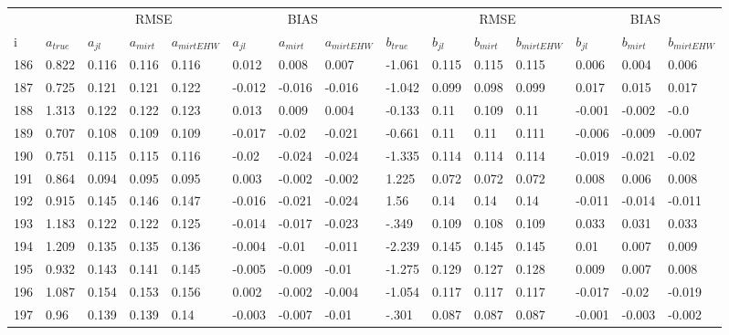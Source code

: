 \begin{table}
	\renewcommand{\arraystretch}{1}%
	\footnotesize
	\centering \begin{tabular}{|l|l|lll|lll|l|lll|lll}
		& &  \multicolumn{3}{c}{RMSE}& \multicolumn{3}{c}{BIAS}& & \multicolumn{3}{c}{RMSE}& \multicolumn{3}{c}{BIAS} \\
		i & $a_{true}$ & $a_{jl}$ & $a_{mirt}$ & $a_{mirt EHW}$ & $ a_{jl} $ & $ a_{mirt} $ & $ a_{mirt EHW} $ & $ b_{true} $ & $ b_{jl} $ & $ b_{mirt} $ & $ b_{mirt EHW} $ & $ b_{jl} $ & $b_{mirt}$ & $b_{mirt EHW}$\\
		\hline
		186 & 0.822 & 0.116 & 0.116 & 0.116 & 0.012 & 0.008 & 0.007 & -1.061 & 0.115 & 0.115 & 0.115 & 0.006 & 0.004 & 0.006 \\
		187 & 0.725 & 0.121 & 0.121 & 0.122 & -0.012 & -0.016 & -0.016 & -1.042 & 0.099 & 0.098 & 0.099 & 0.017 & 0.015 & 0.017 \\
		188 & 1.313 & 0.122 & 0.122 & 0.123 & 0.013 & 0.009 & 0.004 & -0.133 & 0.11 & 0.109 & 0.11 & -0.001 & -0.002 & -0.0 \\
		189 & 0.707 & 0.108 & 0.109 & 0.109 & -0.017 & -0.02 & -0.021 & -0.661 & 0.11 & 0.11 & 0.111 & -0.006 & -0.009 & -0.007 \\
		190 & 0.751 & 0.115 & 0.115 & 0.116 & -0.02 & -0.024 & -0.024 & -1.335 & 0.114 & 0.114 & 0.114 & -0.019 & -0.021 & -0.02 \\
		191 & 0.864 & 0.094 & 0.095 & 0.095 & 0.003 & -0.002 & -0.002 & 1.225 & 0.072 & 0.072 & 0.072 & 0.008 & 0.006 & 0.008 \\
		192 & 0.915 & 0.145 & 0.146 & 0.147 & -0.016 & -0.021 & -0.024 & 1.56 & 0.14 & 0.14 & 0.14 & -0.011 & -0.014 & -0.011 \\
		193 & 1.183 & 0.122 & 0.122 & 0.125 & -0.014 & -0.017 & -0.023 & -.349 & 0.109 & 0.108 & 0.109 & 0.033 & 0.031 & 0.033 \\
		194 & 1.209 & 0.135 & 0.135 & 0.136 & -0.004 & -0.01 & -0.011 & -2.239 & 0.145 & 0.145 & 0.145 & 0.01 & 0.007 & 0.009 \\
		195 & 0.932 & 0.143 & 0.141 & 0.145 & -0.005 & -0.009 & -0.01 & -1.275 & 0.129 & 0.127 & 0.128 & 0.009 & 0.007 & 0.008 \\
		196 & 1.087 & 0.154 & 0.153 & 0.156 & 0.002 & -0.002 & -0.004 & -1.054 & 0.117 & 0.117 & 0.117 & -0.017 & -0.02 & -0.019 \\
		197 & 0.96 & 0.139 & 0.139 & 0.14 & -0.003 & -0.007 & -0.01 & -.301 & 0.087 & 0.087 & 0.087 & -0.001 & -0.003 & -0.002 \\

\end{tabular}
\end{table}
